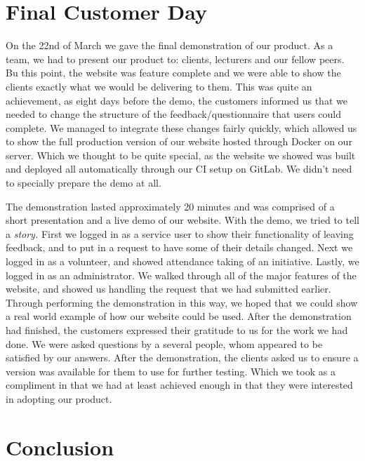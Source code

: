 \documentclass{l3proj}
\begin{document}
\section{Final Customer Day}
\label{sec:finalDay}

On the 22nd of March we gave the final demonstration of our product. As a team, we had to present our product to: clients, lecturers and our fellow peers. Bu this point, the website was feature complete and we were able to show the clients exactly what we would be delivering to them. This was quite an achievement, as eight days before the demo, the customers informed us that we needed to change the structure of the feedback/questionnaire that users could complete. We managed to integrate these changes fairly quickly, which allowed us to show the full production version of our website hosted through Docker on our server. Which we thought to be quite special, as the website we showed was built and deployed all automatically through our CI setup on GitLab. We didn't need to specially prepare the demo at all.

The demonstration lasted approximately 20 minutes and was comprised of a short presentation and a live demo of our website. With the demo, we tried to tell a \textit{story.} First we logged in as a service user to show their functionality of leaving feedback, and to put in a request to have some of their details changed. Next we logged in as a volunteer, and showed attendance taking of an initiative. Lastly, we logged in as an administrator. We walked through all of the major features of the website, and showed us handling the request that we had submitted earlier. Through performing the demonstration in this way, we hoped that we could show a real world example of how our website could be used. After the demonstration had finished, the customers expressed their gratitude to us for the work we had done. We were asked questions by a several people, whom appeared to be satisfied by our answers. After the demonstration, the clients asked us to ensure a version was available for them to use for further testing. Which we took as a compliment in that we had at least achieved enough in that they were interested in adopting our product.

\section{Conclusion}
\end{document}
